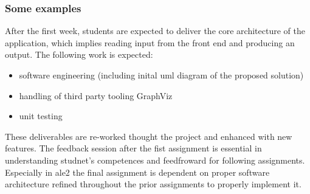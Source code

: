 \subsubsection{Some examples}
After the first week, students are expected to deliver the core architecture of the application, which implies reading input from the front end and producing an output. The following work is expected:
\begin{itemize}
    \item software engineering (including inital \acrshort{uml} diagram of the proposed solution)
    \item handling of third party tooling GraphViz
    \item unit testing 
\end{itemize} 
These deliverables are re-worked thought the project and enhanced with new features. The feedback session after the fist assignment is essential in understanding studnet's competences and feedfroward for following assignments. Especially in \acrshort{ale}2 the final assignment is dependent on proper software architecture refined throughout the prior assignments to properly implement it. 